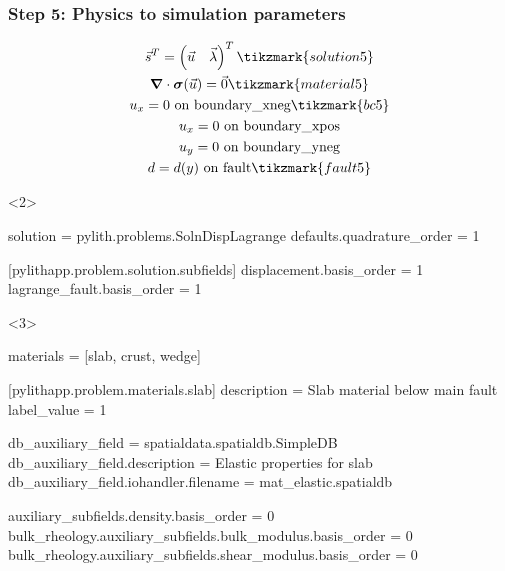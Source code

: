 \documentclass[aspectratio=169]{beamer}
\begin{document}
\begin{frame}[t,fragile]
  \frametitle{Step 5: Physics to simulation parameters}
  \summary{}

  \begin{minipage}[t]{0.3\textwidth}
    {\scriptsize
    \begin{gather*}
    \vec{s}^T = \left( \vec{u} \quad \vec{\lambda} \right)^T \tikzmark{solution5}\\
    \tensor{\nabla} \cdot \tensor{\sigma}(\vec{u}) = \vec{0} \tikzmark{material5}\\
    u_x = 0 \text{ on boundary\_xneg} \tikzmark{bc5}\\
    u_x = 0 \text{ on boundary\_xpos} \\
    u_y = 0 \text{ on boundary\_yneg} \\
    d = d(y) \text{ on fault} \tikzmark{fault5}
    \end{gather*}}
  \end{minipage}
  \hfill
  \begin{minipage}[t]{0.67\textwidth}
    \begin{onlyenv}<2>
      \begin{cfgcode}
        solution = pylith.problems.SolnDispLagrange
        defaults.quadrature_order = 1
        
        [pylithapp.problem.solution.subfields]
        displacement.basis_order = 1
        lagrange_fault.basis_order = 1
      \end{cfgcode}
    \end{onlyenv}
    \begin{onlyenv}<3>
      \begin{cfgcode}
        materials = [slab, crust, wedge]

        [pylithapp.problem.materials.slab]
        description = Slab material below main fault
        label_value = 1

        db_auxiliary_field = spatialdata.spatialdb.SimpleDB
        db_auxiliary_field.description = Elastic properties for slab
        db_auxiliary_field.iohandler.filename = mat_elastic.spatialdb

        auxiliary_subfields.density.basis_order = 0
        bulk_rheology.auxiliary_subfields.bulk_modulus.basis_order = 0
        bulk_rheology.auxiliary_subfields.shear_modulus.basis_order = 0


\end{cfgcode}
\end{onlyenv}
\end{minipage}
\end{frame}
\end{document}
